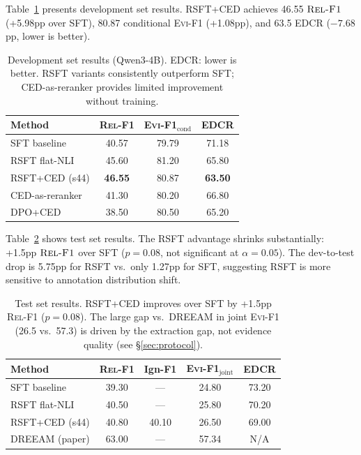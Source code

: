 \documentclass[11pt,a4paper]{article}
\newcommand{\evi}{\textsc{Evi-F1}}
\newcommand{\edcr}{\textsc{EDCR}}
\newcommand{\relf}{\textsc{Rel-F1}}
\begin{document}
Table~\ref{tab:dev_main} presents development set results. RSFT+CED achieves 46.55 $\relf{}$ (+5.98pp over SFT), 80.87 conditional \evi{} (+1.08pp), and 63.5 \edcr{} ($-7.68$pp, lower is better).

\begin{table}[t]
\centering
\small
\begin{tabular}{lccc}
\toprule
\textbf{Method} & \textbf{\relf{}} & \textbf{\evi{}$_\text{cond}$} & \textbf{\edcr{}} \\
\midrule
SFT baseline & 40.57 & 79.79 & 71.18 \\
RSFT flat-NLI & 45.60 & 81.20 & 65.80 \\
RSFT+CED (s44) & \textbf{46.55} & 80.87 & \textbf{63.50} \\
CED-as-reranker & 41.30 & 80.20 & 66.80 \\
DPO+CED & 38.50 & 80.50 & 65.20 \\
\bottomrule
\end{tabular}
\caption{Development set results (Qwen3-4B). \edcr{}: lower is better. RSFT variants consistently outperform SFT; CED-as-reranker provides limited improvement without training.}
\label{tab:dev_main}
\end{table}

Table~\ref{tab:test} shows test set results. The RSFT advantage shrinks substantially: +1.5pp $\relf{}$ over SFT ($p{=}0.08$, not significant at $\alpha{=}0.05$). The dev-to-test drop is 5.75pp for RSFT vs.\ only 1.27pp for SFT, suggesting RSFT is more sensitive to annotation distribution shift.

\begin{table}[t]
\centering
\small
\begin{tabular}{lcccc}
\toprule
\textbf{Method} & \textbf{\relf{}} & \textbf{Ign-F1} & \textbf{\evi{}$_\text{joint}$} & \textbf{\edcr{}} \\
\midrule
SFT baseline & 39.30 & --- & 24.80 & 73.20 \\
RSFT flat-NLI & 40.50 & --- & 25.80 & 70.20 \\
RSFT+CED (s44) & 40.80 & 40.10 & 26.50 & 69.00 \\
\midrule
DREEAM (paper) & 63.00 & --- & 57.34 & N/A \\
\bottomrule
\end{tabular}
\caption{Test set results. RSFT+CED improves over SFT by +1.5pp \relf{} ($p{=}0.08$). The large gap vs.\ DREEAM in joint \evi{} (26.5 vs.\ 57.3) is driven by the extraction gap, not evidence quality (see \S\ref{sec:protocol}).}
\label{tab:test}
\end{table}
\end{document}
